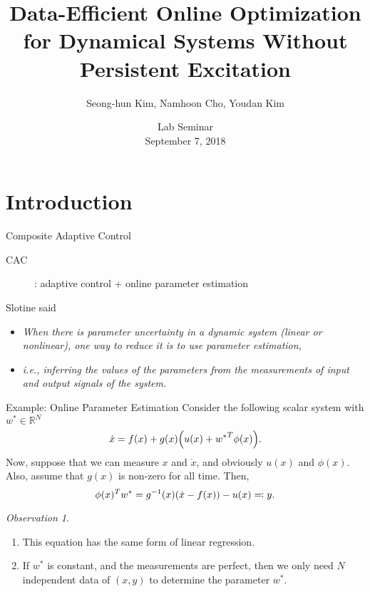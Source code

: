 \documentclass[]{beamer}
\title{Data-Efficient Online Optimization for Dynamical Systems Without
Persistent Excitation}
\author{Seong-hun Kim, Namhoon Cho, Youdan Kim}
\institute{
	Flight Dynamics and Control Lab. \\
	Seoul Natl.~Univ. \\
}
\date{Lab Seminar \\ September 7, 2018}
\theoremstyle{plain}
\theoremstyle{definition}
\theoremstyle{remark}
\newtheorem{observation}{Observation}
\newcommand{\MB}[1]{\mathbb{#1}}
\begin{document}
\begin{frame}
	\maketitle
\end{frame}


\section{Introduction}

\begin{frame}{Composite Adaptive Control}
	\begin{description}
		\item[CAC]: adaptive control + online parameter estimation
	\end{description}

	\vspace{1em}
	Slotine said~
	\begin{itemize}
		\item {\it When there is parameter uncertainty in a dynamic system (linear or
			nonlinear), one way to reduce it is to use parameter estimation,}
		\item {\it i.e., inferring the values of the parameters from the
			measurements of input and output signals of the system.}
	\end{itemize}
\end{frame}

\begin{frame}{Example: Online Parameter Estimation}
	Consider the following scalar system with $w^\ast \in \MB{R}^N$
	\begin{equation*}
		\dot{x} = f(x) + g(x) \qty(u(x) + {w^\ast}^T \phi(x)).
	\end{equation*}
	\pause
	Now, suppose that we can measure $x$ and $\dot{x}$, and obviously $u(x)$ and
	$\phi(x)$. Also, assume that $g(x)$ is non-zero for all time. Then,
	\begin{equation*}
		\phi(x)^T w^\ast = g^{-1}(x) \qty(\dot{x} - f(x)) - u(x) \eqqcolon y.
	\end{equation*}
	\pause
	\begin{observation}
		\begin{enumerate}
			\item This equation has the same form of linear regression.
			\item If $w^\ast$ is constant, and the measurements are perfect, then we
				only need $N$ independent data of $(x, y)$ to determine the parameter
				$w^\ast$.
		\end{enumerate}
	\end{observation}
\end{frame}
\end{document}
